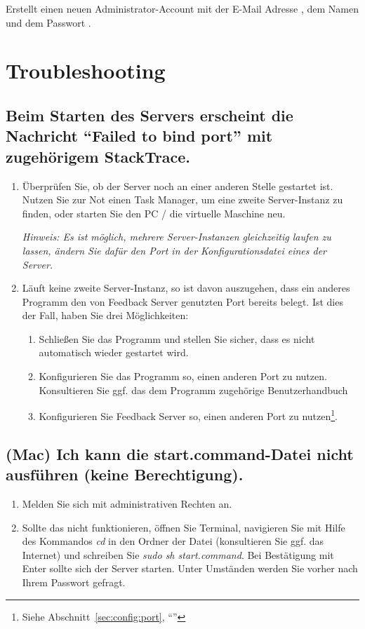 \documentclass[12pt]{article}
\providecommand\meta[1]{\textlangle{\itshape #1\/}\textrangle}
\begin{document}
    Erstellt einen neuen Administrator-Account mit
    der E-Mail Adresse \meta{email}, dem Namen \meta{name}
    und dem Passwort \meta{password}.


    \section{Troubleshooting}

    \subsection[``Failed to bind port'']{Beim Starten des Servers erscheint die Nachricht ``Failed to bind port'' mit zugehörigem StackTrace.}
    \begin{enumerate}
        \item Überprüfen Sie, ob der Server noch an einer anderen Stelle gestartet ist. Nutzen Sie zur Not
        einen Task Manager, um eine zweite Server-Instanz zu finden, oder starten Sie den PC / die
        virtuelle Maschine neu.

        \emph{Hinweis: Es ist möglich, mehrere Server-Instanzen gleichzeitig laufen zu lassen, ändern Sie
        dafür den Port in der Konfigurationsdatei eines der Server.}
        \item Läuft keine zweite Server-Instanz, so ist davon auszugehen, dass ein anderes Programm den
        von Feedback Server genutzten Port bereits belegt. Ist dies der Fall, haben Sie drei
        Möglichkeiten:
        \begin{enumerate}
            \item Schließen Sie das Programm und stellen Sie sicher, dass es nicht automatisch wieder gestartet wird.
            \item Konfigurieren Sie das Programm so, einen anderen Port zu nutzen. Konsultieren Sie ggf. das dem Programm zugehörige Benutzerhandbuch
            \item Konfigurieren Sie Feedback Server so, einen anderen Port zu nutzen\footnote{Siehe Abschnitt~\ref{sec:config:port}, ``''}.
        \end{enumerate}
    \end{enumerate}

    \subsection[Mac: Fehler beim Ausf"uhren von start.command]{(Mac) Ich kann die start.command-Datei nicht ausführen (keine Berechtigung).}
    \begin{enumerate}
        \item Melden Sie sich mit administrativen Rechten an.
        \item Sollte das nicht funktionieren, öffnen Sie Terminal, navigieren Sie mit Hilfe des Kommandos
        \emph{cd} in den Ordner der Datei (konsultieren Sie ggf. das Internet) und schreiben Sie \emph{sudo sh
        start.command}. Bei Bestätigung mit Enter sollte sich der Server starten. Unter Umständen werden Sie
        vorher nach Ihrem Passwort gefragt.
    \end{enumerate}
\end{document}
